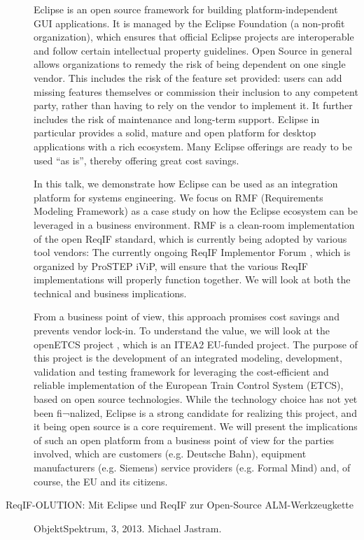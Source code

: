 \begin{description}
Eclipse is an open source framework for building platform-independent GUI applications. It is managed by the Eclipse Foundation (a non-profit organization), which ensures that official Eclipse projects are interoperable and follow certain intellectual property guidelines. Open Source in general allows organizations to remedy the risk of being dependent on one single vendor. This includes the risk of the feature set provided: users can add missing features themselves or commission their inclusion to any competent party, rather than having to rely on the vendor to implement it. It further includes the risk of maintenance and long-term support. Eclipse in particular provides a solid, mature and open platform for desktop applications with a rich ecosystem. Many Eclipse offerings are ready to be used “as is”, thereby offering great cost savings.

In this talk, we demonstrate how Eclipse can be used as an integration platform for systems engineering. We focus on RMF (Requirements Modeling Framework) as a case study on how the Eclipse ecosystem can be leveraged in a business environment. RMF is a clean-room implementation of the open ReqIF standard, which is currently being adopted by various tool vendors: The currently ongoing ReqIF Implementor Forum , which is organized by ProSTEP iViP, will ensure that the various ReqIF implementations will properly function together. We will look at both the technical and business implications.

From a business point of view, this approach promises cost savings and prevents vendor lock-in. To understand the value, we will look at the openETCS project , which is an ITEA2 EU-funded project. The purpose of this project is the development of an integrated modeling, development, validation and testing framework for leveraging the cost-efficient and reliable implementation of the European Train Control System (ETCS), based on open source technologies. While the technology choice has not yet been fi¬nalized, Eclipse is a strong candidate for realizing this project, and it being open source is a core requirement. We will present the implications of such an open platform from a business point of view for the parties involved, which are customers (e.g. Deutsche Bahn), equipment manufacturers (e.g. Siemens) service providers (e.g. Formal Mind) and, of course, the EU and its citizens.

\item[ReqIF-OLUTION: Mit Eclipse und ReqIF zur Open-Source ALM-Werkzeugkette] ObjektSpektrum, 3, 2013. Michael Jastram.


\end{description}
